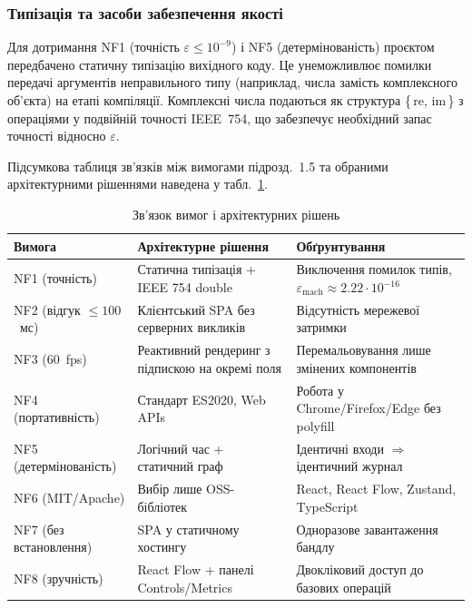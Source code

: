 \subsubsection*{Типізація та засоби забезпечення якості}

Для дотримання NF1 (точність $\varepsilon \le 10^{-9}$) і NF5
(детермінованість) проєктом передбачено статичну типізацію вихідного
коду. Це унеможливлює помилки передачі аргументів неправильного
типу (наприклад, числа замість комплексного об'єкта) на етапі
компіляції. Комплексні числа подаються як структура \{\,re, im\,\}
з операціями у подвійній точності IEEE~754, що забезпечує необхідний
запас точності відносно $\varepsilon$.

Підсумкова таблиця зв'язків між вимогами підрозд.~1.5 та обраними
архітектурними рішеннями наведена у табл.~\ref{tab:req_to_tech}.

\begin{table}[H]
  \caption{Зв'язок вимог і архітектурних рішень}
  \label{tab:req_to_tech}
  \centering
  \small
  \begin{tabular}{p{2.2cm}p{6.0cm}p{5.8cm}}
    \toprule
    Вимога & Архітектурне рішення & Обґрунтування \\
    \midrule
    NF1 (точність) & Статична типізація + IEEE 754 double & Виключення помилок типів, $\varepsilon_{\mathrm{mach}}{\approx}2.22{\cdot}10^{-16}$ \\
    NF2 (відгук $\le 100$~мс) & Клієнтський SPA без серверних викликів & Відсутність мережевої затримки \\
    NF3 (60~fps) & Реактивний рендеринг з підпискою на окремі поля & Перемальовування лише змінених компонентів \\
    NF4 (портативність) & Стандарт ES2020, Web APIs & Робота у Chrome/Firefox/Edge без polyfill \\
    NF5 (детермінованість) & Логічний час + статичний граф & Ідентичні входи $\Rightarrow$ ідентичний журнал \\
    NF6 (MIT/Apache) & Вибір лише OSS-бібліотек & React, React Flow, Zustand, TypeScript \\
    NF7 (без встановлення) & SPA у статичному хостингу & Одноразове завантаження бандлу \\
    NF8 (зручність) & React Flow + панелі Controls/Metrics & Двокліковий доступ до базових операцій \\
    \bottomrule
  \end{tabular}
\end{table}


